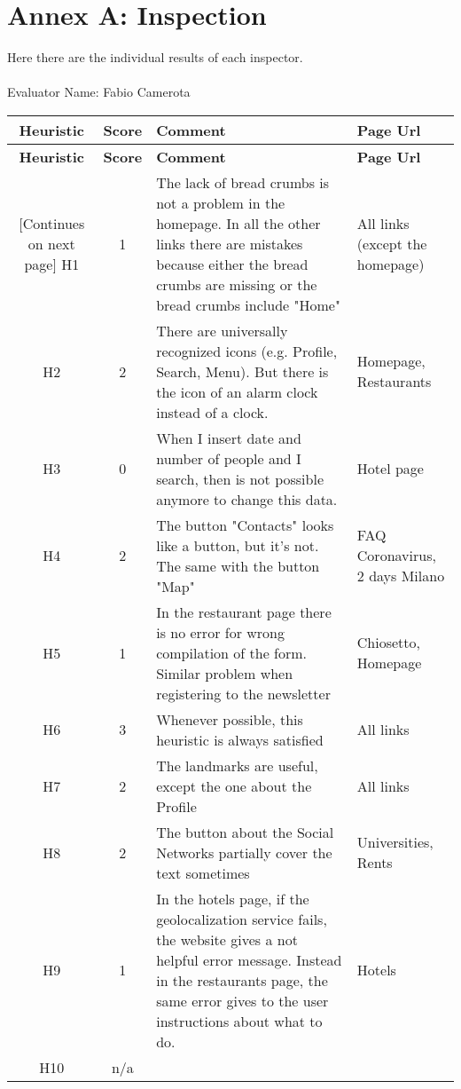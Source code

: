 
\section{Annex A: Inspection}

%
%
Here there are the individual results of each inspector.\\\\
Evaluator Name: Fabio Camerota
\begin{tabularx}{\linewidth}{c c X p{3cm}}
    \textbf{Heuristic} & \textbf{Score} & \textbf{Comment} & \textbf{Page Url}
    \\ \midrule
    \endfirsthead
    \toprule
    \textbf{Heuristic} & \textbf{Score} & \textbf{Comment} & \textbf{Page Url}
    \\ \midrule
    \endhead
    \midrule
    \footnotesize [Continues on next page]
    \endfoot
    \bottomrule
    \endlastfoot
    H1 & 1 & The lack of bread crumbs is not a problem in the homepage.
    In all the other links there are mistakes because either the bread crumbs are missing or the bread crumbs include "Home" & All links (except the homepage)\\ \midrule
    H2 & 2 & There are universally recognized icons (e.g. Profile, Search, Menu). But there is the icon of an alarm clock instead of a clock. & Homepage, Restaurants \\ \midrule
    H3 & 0 & When I insert date and number of people and I search, then is not possible anymore to change this data.& Hotel page\\ \midrule
    H4 & 2 & The button "Contacts" looks like a button, but it's not. The same with the button "Map" & FAQ Coronavirus, 2 days Milano\\ \midrule
    H5 & 1 & In the restaurant page there is no error for wrong compilation of the form. Similar problem when registering to the newsletter& Chiosetto, Homepage\\ \midrule
    H6 & 3 & Whenever possible, this heuristic is always satisfied& All links\\ \midrule
    H7 & 2 & The landmarks are useful, except the one about the Profile & All links\\ \midrule
    H8 & 2 & The button about the Social Networks partially cover the text sometimes & Universities, Rents\\ \midrule
    H9 & 1 & In the hotels page, if the geolocalization service fails, the website gives a not helpful error message. Instead in the restaurants page, the same error gives to the user instructions about what to do. & Hotels \\ \midrule
    H10 & n/a & &
\end{tabularx}
    
